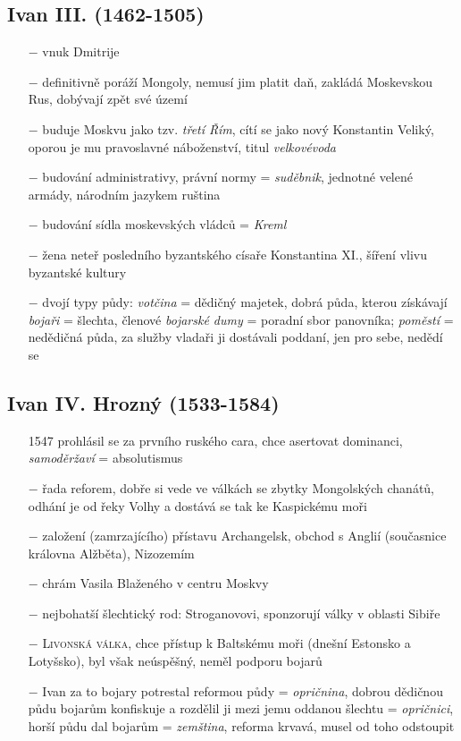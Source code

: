 \documentclass{article}
\begin{document}
  \subsection*{Ivan III. (1462-1505)}
  \begin{itemize}
      \vspace{-0.5em}
      \setlength\itemsep{0.15em}
      \item[$-$] vnuk Dmitrije
      \item[$-$] definitivně poráží Mongoly, nemusí jim platit daň, zakládá Moskevskou Rus, dobývají zpět své území
      \item[$-$] buduje Moskvu jako tzv. \textit{třetí Řím}, cítí se jako nový Konstantin Veliký, oporou je mu pravoslavné náboženství, titul \textit{velkovévoda}
      \item[$-$] budování administrativy, právní normy = \textit{suděbnik}, jednotné velené armády, národním jazykem ruština
      \item[$-$] budování sídla moskevských vládců = \textit{Kreml}
      \item[$-$] žena neteř posledního byzantského císaře Konstantina XI., šíření vlivu byzantské kultury
      \item[$-$] dvojí typy půdy: \textit{votčina} = dědičný majetek, dobrá půda, kterou získávají \textit{bojaři} = šlechta, členové \textit{bojarské dumy} = poradní sbor panovníka; \textit{poměstí} = nedědičná půda, za služby vladaři ji dostávali poddaní, jen pro sebe, nedědí se
  \end{itemize}

  \subsection*{Ivan IV. Hrozný (1533-1584)}
  \begin{itemize}
      \vspace{-0.5em}
      \setlength\itemsep{0.15em}
      \item[1547] prohlásil se za prvního ruského cara, chce asertovat dominanci, \textit{samoděržaví} = absolutismus
      \item[$-$] řada reforem, dobře si vede ve válkách se zbytky Mongolských chanátů, odhání je od řeky Volhy a dostává se tak ke Kaspickému moři
      \item[$-$] založení (zamrzajícího) přístavu Archangelsk, obchod s Anglií (současnice královna Alžběta), Nizozemím
      \item[$-$] chrám Vasila Blaženého v centru Moskvy
      \item[$-$] nejbohatší šlechtický rod: Stroganovovi, sponzorují války v oblasti Sibiře
      \item[$-$] \textsc{Livonská válka}, chce přístup k Baltskému moři (dnešní Estonsko a Lotyšsko), byl však neúspěšný, neměl podporu bojarů
      \item[$-$] Ivan za to bojary potrestal reformou půdy = \textit{opričnina}, dobrou dědičnou půdu bojarům konfiskuje a rozdělil ji mezi jemu oddanou šlechtu = \textit{opričnici}, horší půdu dal bojarům = \textit{zemština}, reforma krvavá, musel od toho odstoupit
  \end{itemize}
\end{document}
